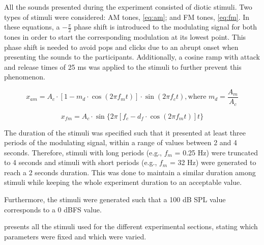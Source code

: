\documentclass[../main.tex]{subfiles}
\begin{document}
All the sounds presented during the experiment consisted of diotic stimuli. Two
types of stimuli were considered: \gls{AM} tones, \cref{eq:am}; and \gls{FM}
tones, \cref{eq:fm}. In these equations, a $-\frac{\pi}{2}$ phase shift is
introduced to the modulating signal for both tones in order to start the
corresponding modulation at its lowest point. This phase shift is needed to
avoid pops and clicks due to an abrupt onset when presenting the sounds to the
participants. Additionally, a cosine ramp with attack and release times of 25 ms
was applied to the stimuli to further prevent this phenomenon.

\begin{equation}
  x_{am} = A_c \cdot [1 - m_d \cdot \cos(2 \pi f_m t)] \cdot \sin(2 \pi f_c t),
 \text{where } m_d = \frac{A_m}{A_c}
  \label{eq:am}
\end{equation}

\begin{equation}
  x_{fm} = A_c \cdot \sin \{2 \pi [f_c - d_f \cdot \cos(2 \pi f_m t)] t \}
  \label{eq:fm}
\end{equation}

The duration of the stimuli was specified such that it presented at least three
periods of the modulating signal, within a range of values between 2 and 4
seconds. Therefore, stimuli with long periods (e.g., $f_m$ = 0.25 Hz) were
truncated to 4 seconds and stimuli with short periods (e.g., $f_m$ = 32 Hz) were
generated to reach a 2 seconds duration. This was done to maintain a similar
duration among stimuli while keeping the whole experiment duration to an
acceptable value.

Furthermore, the stimuli were generated such that a 100 dB SPL value
corresponds to a 0 dBFS value.

 presents all the stimuli used for the different
experimental sections, stating which parameters were fixed and which were varied.
\end{document}
